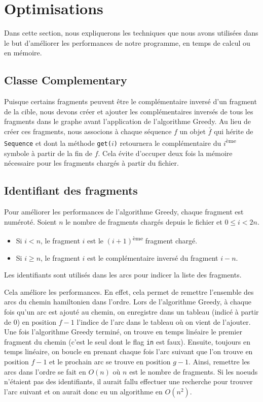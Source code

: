 \section{Optimisations}
Dans cette section, nous expliquerons les techniques que nous avons utilisées dans le but d'améliorer les performances de notre programme, en temps de calcul ou en mémoire.

\subsection{Classe Complementary}
Puisque certains fragments peuvent être le complémentaire inversé d'un fragment
de la cible, nous devons créer et ajouter les complémentaires inversés de
tous les fragments dans le graphe avant l'application de l'algorithme Greedy.
Au lieu de créer ces fragments, nous associons à chaque séquence $f$ un objet
$\bar{f}$ qui hérite de \texttt{Sequence} et dont la méthode \texttt{get($i$)}
retournera le complémentaire du $i$\textsuperscript{ème} symbole
à partir de la fin de $f$.
Cela évite d'occuper deux fois la mémoire nécessaire
pour les fragments chargés à partir du fichier.

\subsection{Identifiant des fragments}
Pour améliorer les performances de l'algorithme Greedy, chaque fragment est
numéroté. Soient $n$ le nombre de fragments chargés depuis le fichier et $0 \le i < 2n$.
\begin{itemize}
 \item Si $i < n$, le fragment $i$ est le $(i+1)$\textsuperscript{ème} fragment chargé.
 \item Si $i \ge n$, le fragment $i$ est le complémentaire inversé du fragment $i-n$.
\end{itemize}

Les identifiants sont utilisés dans les arcs pour indicer la liste des fragments.

Cela améliore les performances. En effet, cela permet de remettre l'ensemble
des arcs du chemin hamiltonien dans l'ordre.
Lors de l'algorithme Greedy, à chaque fois qu'un arc  est ajouté
au chemin, on enregistre dans un tableau (indicé à partir de 0)
en position $f-1$ l'indice de l'arc dans le tableau où on vient de l'ajouter.
Une fois l'algorithme Greedy terminé, on trouve en temps linéaire
le premier fragment du chemin (c'est le seul dont le flag \texttt{in} est faux).
Ensuite, toujours en temps linéaire, on boucle en prenant chaque fois
l'arc  suivant que l'on trouve en position $f-1$ et
le prochain arc se trouve en position $g-1$.
Ainsi, remettre les arcs dans l'ordre se fait en $O(n)$
où $n$ est le nombre de fragments.
Si les noeuds n'étaient pas des identifiants, il aurait fallu effectuer
une recherche pour trouver l'arc suivant et
on aurait donc eu un algorithme en $O\left(n^2\right)$.

